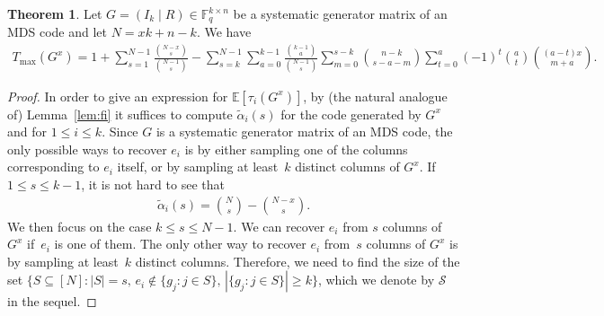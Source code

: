\documentclass[11pt,a4paper,reqno,twoside]{amsart}
\theoremstyle{definition}
\newtheorem{theorem}{Theorem}
\newcommand{\F}{\mathbb{F}}
\newcommand{\E}{\mathbb{E}}
\newcommand{\mS}{\mathcal{S}}
\newcommand{\tmax}{T_{\max}}
\begin{document}
\begin{theorem} \label{prop:extmds}
Let $G= (I_k \mid R) \in \F_q^{k \times n}$ be a systematic generator matrix of an MDS code and let $N=xk+n-k$. We have
\begin{align*}
\tmax(G^x) = 1+\sum_{s=1}^{N-1}\frac{\binom{N-x}{s}}{\binom{N-1}{s}} -\sum_{s=k}^{N-1}\sum_{a=0}^{k-1}\frac{\binom{k-1}{a}}{\binom{N-1}{s}} \sum_{m=0}^{s-k}\binom{n-k}{s-a-m}\sum_{t=0}^a(-1)^t\binom{a}{t}\binom{(a-t)x}{m+a}.
\end{align*}
\end{theorem}
\begin{proof}
In order to give an expression for $\E[\tau_i(G^x)]$, by (the natural analogue of) Lemma~\ref{lem:fi} it suffices to compute $\widetilde{\alpha}_i(s)$
for the code generated by $G^x$ and for $1\leq i\leq k$. Since $G$ is a systematic generator matrix of an MDS code, the only possible ways to recover $e_i$ is by either sampling one of the columns corresponding to $e_i$ itself, or by sampling at least~$k$ distinct columns of $G^x$. If $1\le s \le k-1$, it is not hard to see that 
\begin{align*}
        \widetilde{\alpha}_i(s) = \binom{N}{s}-\binom{N-x}{s}.
\end{align*}
We then focus on the case
$k\le s \le N-1$.
We can recover $e_i$ from $s$ columns of $G^x$ if~$e_i$ is one of them. The only other way to recover $e_i$ from~$s$ columns of $G^x$ is by sampling at least~$k$ distinct columns. Therefore, we need to find the size of the set
    $\{S \subseteq [N] : |S|=s, \, e_i \notin \{g_j : j \in S\}, \, |\{ g_j : j \in S\}| \ge k\}$,
    which we denote by $\mS$ in the sequel.
    

\end{proof}
\end{document}
